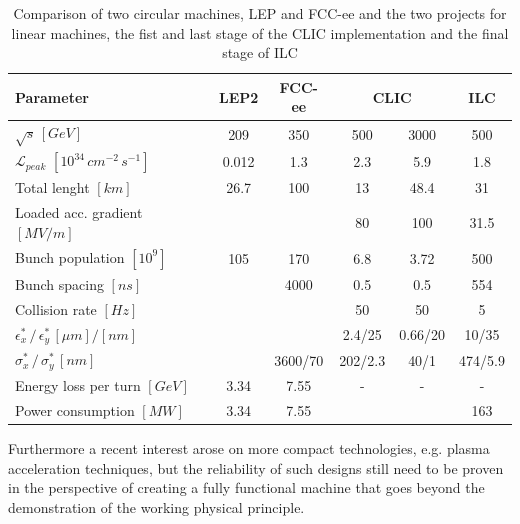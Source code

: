 \begin{table}
  \centering
    \begin{tabular}{ l c c | c c c }
    \hline
    \hline
    Parameter								& LEP2	&	FCC-ee	&  \multicolumn{2}{c}{CLIC}	&	ILC	\\
    \hline
    $\sqrt{s} \, [GeV]$				& 209	& 350  		&  	500	&  3000	& 500	\\
    $\mathscr{L}_{peak}$  $[10^{34} \, cm^{-2} \, s^{-1}]$	&0.012	& 1.3			&  	2.3	& 	5.9	&1.8		\\
    Total lenght $[km]$						&26.7	& 100		& 13		&  48.4	& 31		\\
    Loaded acc. gradient $[MV/m]$				&		& 			& 80		& 100 	& 31.5	\\
    Bunch population $[10^9]$					& 105	& 170  		&  6.8	& 	3.72	& 500	\\
    Bunch spacing $[ns]$						& 		& 4000	  	&  	0.5	& 	0.5	& 554	\\
    Collision rate $[Hz]$						&  		&  			&  	50	& 	50	& 5		\\
    $\epsilon^*_x \, / \, \epsilon^*_y \, [\mu m]/[nm]$	& 		&  		        &  2.4/25	& 0.66/20	& 10/35	\\  
    $\sigma^*_x\, / \, \sigma^*_y\, [nm]$			& 		&  	3600/70	&  202/2.3	& 40/1	&474/5.9	\\    
    Energy loss per turn $[GeV]$					&  3.34	& 	7.55		& - 		& -		& -		\\
    Power consumption $[MW]$					&  3.34	& 	7.55		& 		& 		& 163	\\
    \hline
    \hline
    \end{tabular}
  \caption{Comparison of two circular machines, LEP\cite{FCC-ee:leptonCollParam} and FCC-ee\cite{FCC-ee:leptonCollParam,Zimmermann:2057706} and the two projects for linear machines, the fist and last stage of the CLIC implementation \cite{CLIC:cdr} and the final stage of ILC\cite{ILC:tdr} }
\label{table_CLIC_ILC_FCC}
\end{table}



Furthermore a recent interest arose on more compact technologies, e.g. plasma acceleration techniques, but the reliability of such designs still need to be proven in the perspective of creating a fully functional machine that goes beyond the demonstration of the working physical principle.







\newpage
